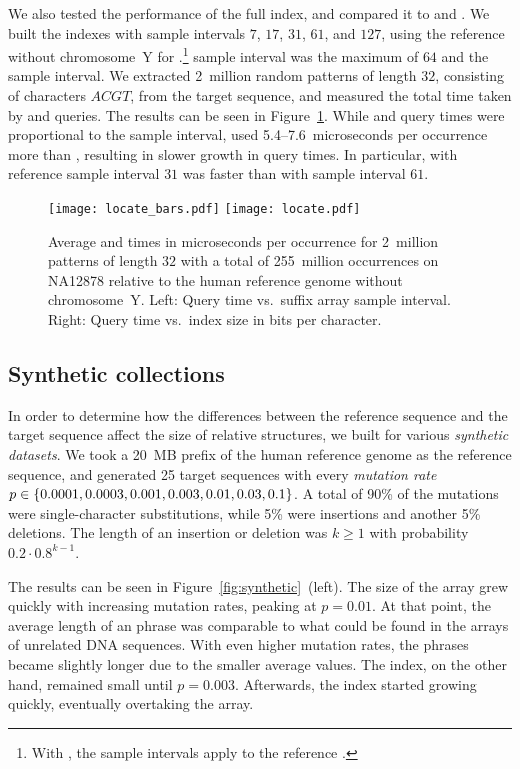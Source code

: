 We also tested the \locate{} performance of the full \RFM{} index, and
compared it to \SSA{} and \SSArrr. We built the indexes with \SA{} sample
intervals $7$, $17$, $31$, $61$, and $127$, using the reference without
chromosome~Y for \RFM.\footnote{With \RFM, the sample intervals apply
to the reference \SSA.} \ISA{} sample interval was the
maximum of $64$ and the \SA{} sample interval. We extracted 2~million
random patterns of length $32$, consisting of characters $ACGT$, from
the target sequence, and measured the total time taken by \find{} and
\locate{} queries. The results can be seen in
Figure~\ref{fig:locate}. While \SSA{} and \SSArrr{} query times were
proportional to the sample interval, \RFM{} used 5.4\nobreakdash--7.6~microseconds
per occurrence more than \SSA{}, resulting in slower growth in query times.
In particular, \RFM{} with reference sample interval $31$ was faster than
\SSA{} with sample interval $61$.

\begin{figure}
\begin{center}
\texttt{[image: locate\_bars.pdf]}%
\hspace{-0.6in}%
\texttt{[image: locate.pdf]}
\end{center}
\caption{Average \find{} and \locate{} times in microseconds per occurrence for 2~million patterns
of length $32$ with a total of 255~million occurrences on NA12878 relative to
the human reference genome without chromosome~Y. Left: Query time vs.\ suffix array
sample interval. Right: Query time vs.\ index size in bits per character.}\label{fig:locate}
\end{figure}

\subsection{Synthetic collections}

In order to determine how the differences between the reference sequence and
the target sequence affect the size of relative structures, we built \RST{}
for various \emph{synthetic datasets}. We took a 20~MB prefix of the human
reference genome as the reference sequence, and generated 25 target
sequences with every \emph{mutation rate} $p \in \{ 0.0001, 0.0003, 0.001, 0.003,
0.01, 0.03, 0.1 \}$. A total of 90\% of the mutations were single-character
substitutions, while 5\% were insertions and another 5\% deletions. The length of an
insertion or deletion was $k \ge 1$ with probability $0.2 \cdot 0.8^{k-1}$.

The results can be seen in Figure~\ref{fig:synthetic}~(left). The size of the \RLCP{}
array grew quickly with increasing mutation rates, peaking at $p = 0.01$.
At that point, the average length of an \RLZ{} phrase was comparable to what
could be found in the \DLCP{} arrays of unrelated DNA sequences. With even
higher mutation rates, the phrases became slightly longer due to the smaller
average \LCP{} values. The \RFM{} index, on the other hand, remained small
until $p = 0.003$. Afterwards, the index started growing quickly, eventually
overtaking the \RLCP{} array.

